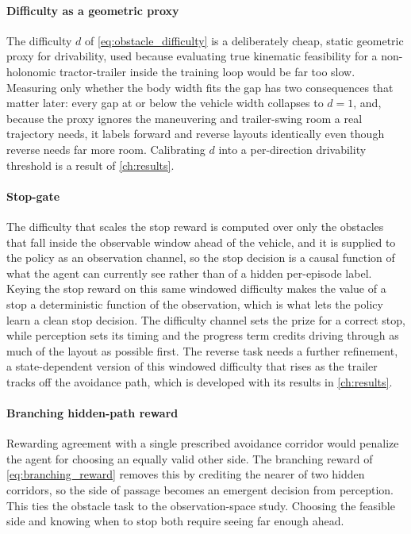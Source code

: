 \paragraph{Difficulty as a geometric proxy}
The difficulty $d$ of \cref{eq:obstacle_difficulty} is a deliberately cheap, static geometric proxy for drivability, used because evaluating true kinematic feasibility for a non-holonomic tractor-trailer inside the training loop would be far too slow. Measuring only whether the body width fits the gap has two consequences that matter later: every gap at or below the vehicle width collapses to $d=1$, and, because the proxy ignores the maneuvering and trailer-swing room a real trajectory needs, it labels forward and reverse layouts identically even though reverse needs far more room. Calibrating $d$ into a per-direction drivability threshold is a result of \cref{ch:results}.

\paragraph{Stop-gate}
The difficulty that scales the stop reward is computed over only the obstacles that fall inside the observable window ahead of the vehicle, and it is supplied to the policy as an observation channel, so the stop decision is a causal function of what the agent can currently see rather than of a hidden per-episode label. Keying the stop reward on this same windowed difficulty makes the value of a stop a deterministic function of the observation, which is what lets the policy learn a clean stop decision. The difficulty channel sets the prize for a correct stop, while perception sets its timing and the progress term credits driving through as much of the layout as possible first. The reverse task needs a further refinement, a state-dependent version of this windowed difficulty that rises as the trailer tracks off the avoidance path, which is developed with its results in \cref{ch:results}.

\paragraph{Branching hidden-path reward}
Rewarding agreement with a single prescribed avoidance corridor would penalize the agent for choosing an equally valid other side. The branching reward of \cref{eq:branching_reward} removes this by crediting the nearer of two hidden corridors, so the side of passage becomes an emergent decision from perception. This ties the obstacle task to the observation-space study. Choosing the feasible side and knowing when to stop both require seeing far enough ahead.

